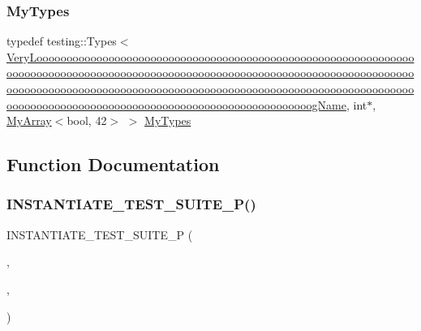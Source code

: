 \subsubsection{\texorpdfstring{MyTypes}{MyTypes}}
{\footnotesize\ttfamily typedef testing\+::\+Types$<$\mbox{\hyperlink{class_very_loooooooooooooooooooooooooooooooooooooooooooooooooooooooooooooooooooooooooooooooooooo570db76e21fa868abfe0f6323a68c9ba}{Very\+Loooooooooooooooooooooooooooooooooooooooooooooooooooooooooooooooooooooooooooooooooooooooooooooooooooooooooooooooooooooooooooooooooooooooooooooooooooooooooooooooooooooooooooooooooooooooooooooooooooooooooooooooooooooooooooooooooooooooooooooooooooooooooog\+Name}}, int$\ast$, \mbox{\hyperlink{class_my_array}{My\+Array}}$<$bool, 42$>$ $>$ \mbox{\hyperlink{googletest-master_2googletest_2test_2googletest-list-tests-unittest___8cc_a16f58cd49c18568802322bbaf9f3f654}{My\+Types}}}



\subsection{Function Documentation}
\mbox{\label{_obj__test_2lib_2googletest-master_2googletest_2test_2googletest-list-tests-unittest___8cc_ac2b79a5b6af77ea7410b124b0904ddd4}} 
\subsubsection{\texorpdfstring{INSTANTIATE\_TEST\_SUITE\_P()}{INSTANTIATE\_TEST\_SUITE\_P()}}
{\footnotesize\ttfamily I\+N\+S\+T\+A\+N\+T\+I\+A\+T\+E\+\_\+\+T\+E\+S\+T\+\_\+\+S\+U\+I\+T\+E\+\_\+P (\begin{DoxyParamCaption}\item[{My\+Instantiation}]{,  }\item[{\mbox{\hyperlink{class_value_param_test}{Value\+Param\+Test}}}]{,  }\item[{\mbox{\hyperlink{namespacetesting_abd3c87b40c2a0663691c9b617ed5fcc2}{testing\+::\+Values}}(\mbox{\hyperlink{class_my_type}{My\+Type}}(\char`\"{}one line\char`\"{}), My\+Type(\char`\"{}two\textbackslash{}nlines\char`\"{}), My\+Type(\char`\"{}a very\textbackslash{}nloooooooooooooooooooooooooooooooooooooooooooooooooooooooooooooooooooooooooooooooooooooooooooooooooooooooooooooooooooooooooooooooooooooooooooooooooooooooooooooooooooooooooooooooooooooooooooooooooooooooooooooooooooooooooooooooooooooooooooooooooooooooooong line\char`\"{}))}]{ }\end{DoxyParamCaption})}

